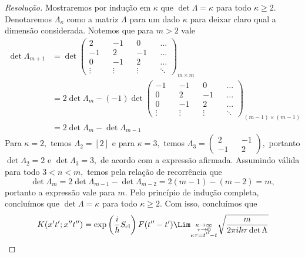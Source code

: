 \begin{proof}[Resolução]
   Mostraremos por indução em \(\kappa\) que \(\det{\Lambda} = \kappa\) para todo \(\kappa \geq 2\). Denotaremos \(\Lambda_{\kappa}\) como a matriz \(\Lambda\) para um dado \(\kappa\) para deixar claro qual a dimensão considerada. Notemos que para \(m > 2\) vale
   \begin{align*}
      \det \Lambda_{m + 1} &= \det \begin{pmatrix}
         2 && -1 && 0 && \dots\\
         -1 && 2 && -1 && \dots\\
         0 && -1 && 2 && \dots\\
         \vdots && \vdots && \vdots && \ddots
      \end{pmatrix}_{m \times m}\\
                           &= 2 \det \Lambda_m - (-1) \det \begin{pmatrix}
                              -1 && -1 && 0 && \dots\\
                              0 && 2 && -1 && \dots\\
                              0 && -1 && 2 && \dots\\
                              \vdots && \vdots && \vdots && \ddots
                           \end{pmatrix}_{(m-1) \times (m-1)}\\
                           &= 2\det \Lambda_m - \det \Lambda_{m -1}
      \end{align*}
      Para \(\kappa = 2,\) temos \(\Lambda_2 = [2]\) e para \(\kappa = 3,\) temos \(\Lambda_3 = \left(\begin{smallmatrix}
            2 && -1\\
            -1 && 2
      \end{smallmatrix}\right),\) portanto \(\det{\Lambda_2} = 2\) e \(\det{\Lambda_3} = 3,\) de acordo com a expressão afirmada. Assumindo válida para todo \(3 < n < m,\) temos pela relação de recorrência que
      \begin{equation*}
         \det \Lambda_{m} = 2 \det{\Lambda_{m - 1}} - \det{\Lambda_{m - 2}} = 2(m - 1) - (m - 2) = m,
      \end{equation*}
      portanto a expressão vale para \(m.\) Pelo princípio de indução completa, concluímos que \(\det \Lambda = \kappa\) para todo \(\kappa \geq 2.\) Com isso, concluímos que
      \begin{align*}
         K(x't'; x''t'') &= \exp\left(\frac{i}{\hbar} S_{\mathrm{cl}}\right)F(t'' - t') \Lim_{\substack{\kappa \to \infty\\ \tau \to 0\\ \kappa \tau = t'' - t}}{\sqrt{\frac{m}{2\pi i \hbar \tau \det \Lambda}}}\\

\end{align*}
\end{proof}
